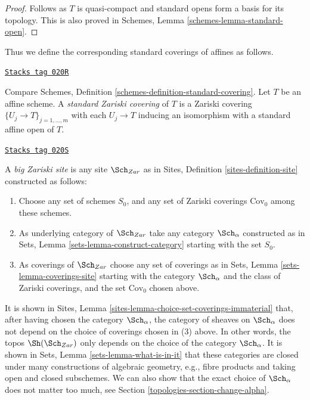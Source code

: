 \begin{proof}
Follows as $T$ is quasi-compact and standard opens form a basis
for its topology. This is also proved in
Schemes, Lemma \ref{schemes-lemma-standard-open}.
\end{proof}

Thus we define the corresponding standard coverings of affines as follows.

\begin{definition}
\label{topologies-definition-standard-Zariski}
\href{https://stacks.math.columbia.edu/tag/020R}{\texttt{Stacks tag 020R}}

Compare Schemes, Definition \ref{schemes-definition-standard-covering}.
Let $T$ be an affine scheme. A {\it standard Zariski covering}
of $T$ is a Zariski covering $\{U_j \to T\}_{j = 1, \ldots, m}$
with each $U_j \to T$ inducing an isomorphism with a standard affine open
of $T$.
\end{definition}

\begin{definition}
\label{topologies-definition-big-zariski-site}
\href{https://stacks.math.columbia.edu/tag/020S}{\texttt{Stacks tag 020S}}

A {\it big Zariski site} is any site $\Sch_{Zar}$ as in
Sites, Definition \ref{sites-definition-site} constructed as follows:
\begin{enumerate}
\item Choose any set of schemes $S_0$, and any set of Zariski coverings
$\text{Cov}_0$ among these schemes.
\item As underlying category of $\Sch_{Zar}$
take any category $\Sch_\alpha$ constructed as in
Sets, Lemma \ref{sets-lemma-construct-category} starting with the set $S_0$.
\item As coverings of $\Sch_{Zar}$ choose any set of coverings as in
Sets, Lemma \ref{sets-lemma-coverings-site} starting with the
category $\Sch_\alpha$ and the class of Zariski coverings,
and the set $\text{Cov}_0$ chosen above.
\end{enumerate}
\end{definition}

It is shown in Sites, Lemma \ref{sites-lemma-choice-set-coverings-immaterial}
that, after having chosen the category $\Sch_\alpha$, the
category of sheaves on $\Sch_\alpha$ does not depend on the
choice of coverings chosen in (3) above. In other words, the topos
$\Sh(\Sch_{Zar})$ only depends on the choice of
the category $\Sch_\alpha$. It is shown in
Sets, Lemma \ref{sets-lemma-what-is-in-it} that these categories
are closed under many constructions of algebraic geometry, e.g.,
fibre products and taking open and closed subschemes. We can also show
that the exact choice of $\Sch_\alpha$ does not matter
too much, see Section \ref{topologies-section-change-alpha}.

